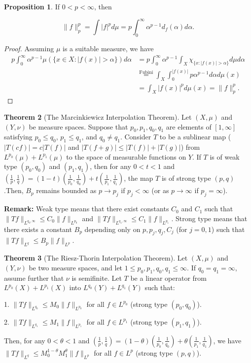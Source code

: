 \documentclass[12pt,openany]{book}
\theoremstyle{definition}
\newtheorem{theorem}{Theorem}[section]
\newtheorem{proposition}[theorem]{Proposition}
\begin{document}
\begin{proposition}
    If $0 < p < \infty$, then

$$\|f\|_p^p = \int |f|^p d\mu = p \int_0^{\infty} \alpha^{p-1} d_f(\alpha) d\alpha.$$
\end{proposition} 
\begin{proof}
    Assuming $\mu$ is a suitable measure, we have
$$
\begin{aligned}
p \int_0^{\infty} \alpha^{p-1} \mu(\{x \in X: |f(x)| > \alpha\}) d\alpha &= p \int_0^{\infty} \alpha^{p-1} \int_X \chi_{\{x: |f(x)| > \alpha\}} d\mu d\alpha \\
&\stackrel{\text{Fubini}}{=} \int_X \int_0^{|f(x)|} p \alpha^{p-1} d\alpha d\mu(x) \\
&= \int_X |f(x)|^p d\mu(x) = \|f\|_p^p.
\end{aligned}
$$
\end{proof}
\begin{theorem}[The Marcinkiewicz Interpolation Theorem]
    Let $(X, \mu)$ and $(Y, \nu)$ be measure spaces. Suppose that $p_0, p_1, q_0, q_1$ are elements of $[1, \infty]$ satisfying $p_0 \leqslant q_0$, $p_1 \leqslant q_1$, and $q_0 \neq q_1$. Consider $T$ to be a sublinear map ($|T(cf)| = c|T(f)|$ and $|T(f+g)| \leqslant |T(f)| + |T(g)|$) from $L^{p_0}(\mu) + L^{p_1}(\mu)$ to the space of measurable functions on $Y$. If $T$ is of weak type $(p_0, q_0)$ and $(p_1, q_1)$, then for any $0 < t < 1$ and $\left(\frac{1}{p}, \frac{1}{q}\right) = (1-t)\left(\frac{1}{p_0}, \frac{1}{q_0}\right) + t\left(\frac{1}{p_1}, \frac{1}{q_1}\right)$, the map $T$ is of strong type $(p, q)$.Then, $B_p$ remains bounded as $p \rightarrow p_j$ if $p_j < \infty$ (or as $p \rightarrow \infty$ if $p_j = \infty$).
\end{theorem}
\noindent\textbf{Remark:}
Weak type means that there exist constants $C_0$ and $C_1$ such that $\|Tf\|_{L^{q_0, \infty}} \leqslant C_0\|f\|_{L^{p_0}}$ and $\|Tf\|_{L^{q_1, \infty}} \leqslant C_1\|f\|_{L^{p_1}}$.
Strong type means that there exists a constant $B_p$ depending only on $p, p_j, q_j, C_j$ (for $j = 0, 1$) such that $\|Tf\|_{L^q} \leqslant B_p\|f\|_{L^p}$. 
\begin{theorem}[The Riesz-Thorin Interpolation Theorem]
    
Let $(X, \mu)$ and $(Y, \nu)$ be two measure spaces, and let $1 \leqslant p_0, p_1, q_0, q_1 \leqslant \infty$. If $q_0 = q_1 = \infty$, assume further that $\nu$ is semifinite. Let $T$ be a linear operator from $L^{p_0}(X) + L^{p_1}(X)$ into $L^{q_0}(Y) + L^{q_1}(Y)$ such that:

1. $\|Tf\|_{L^{q_0}} \leqslant M_0\|f\|_{L^{p_0}}$ for all $f \in L^{p_0}$ (strong type $(p_0, q_0)$).

2. $\|Tf\|_{L^{q_1}} \leqslant M_1\|f\|_{L^{p_1}}$ for all $f \in L^{p_1}$ (strong type $(p_1, q_1)$).

Then, for any $0 < \theta < 1$ and $\left(\frac{1}{p}, \frac{1}{q}\right) = (1-\theta)\left(\frac{1}{p_0}, \frac{1}{q_0}\right) + \theta\left(\frac{1}{p_1}, \frac{1}{q_1}\right)$, we have $\|Tf\|_{L^q} \leqslant M_0^{1-\theta}M_1^\theta\|f\|_{L^p}$ for all $f \in L^p$ (strong type $(p, q)$).
\end{theorem}
\end{document}
